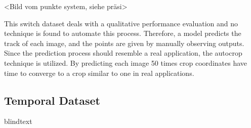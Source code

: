 \vspace{1cm}
<Bild vom punkte system, siehe präsi>
\vspace{1cm}

This switch dataset deals with a qualitative performance evaluation and no technique is found to automate this process.
Therefore, a model predicts the track of each image, and the points are given by manually observing outputs.
Since the prediction process should resemble a real application, the autocrop technique is utilized.
By predicting each image 50 times crop coordinates have time to converge to a crop similar to one in real applications.

\subsection{Temporal Dataset}

blindtext
